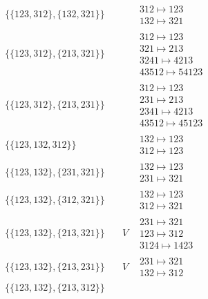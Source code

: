 \begin{tiny}
\begin{align}
\begin{matrix}
\end{matrix}
\\
\{\{123, 312\}, \{132, 321\}\}
\quad
&
\phantom{.}
&
\begin{matrix}
312 \mapsto 123\\132 \mapsto 321
\end{matrix}
\\
\{\{123, 312\}, \{213, 321\}\}
\quad
&
\phantom{.}
&
\begin{matrix}
312 \mapsto 123\\321 \mapsto 213\\3241 \mapsto 4213\\43512 \mapsto 54123
\end{matrix}
\\
\{\{123, 312\}, \{213, 231\}\}
\quad
&
\phantom{.}
&
\begin{matrix}
312 \mapsto 123\\231 \mapsto 213\\2341 \mapsto 4213\\43512 \mapsto 45123
\end{matrix}
\\
\{\{123, 132, 312\}\}
\quad
&
\phantom{.}
&
\begin{matrix}
132 \mapsto 123\\312 \mapsto 123
\end{matrix}
\\
\{\{123, 132\}, \{231, 321\}\}
\quad
&
\phantom{.}
&
\begin{matrix}
132 \mapsto 123\\231 \mapsto 321
\end{matrix}
\\
\{\{123, 132\}, \{312, 321\}\}
\quad
&
\phantom{.}
&
\begin{matrix}
132 \mapsto 123\\312 \mapsto 321
\end{matrix}
\\
\{\{123, 132\}, \{213, 321\}\}
\quad
&
V
&
\begin{matrix}
231 \mapsto 321\\123 \mapsto 312\\3124 \mapsto 1423
\end{matrix}
\\
\{\{123, 132\}, \{213, 231\}\}
\quad
&
V
&
\begin{matrix}
231 \mapsto 321\\132 \mapsto 312
\end{matrix}
\\
\{\{123, 132\}, \{213, 312\}\}

\end{align}
\end{tiny}
